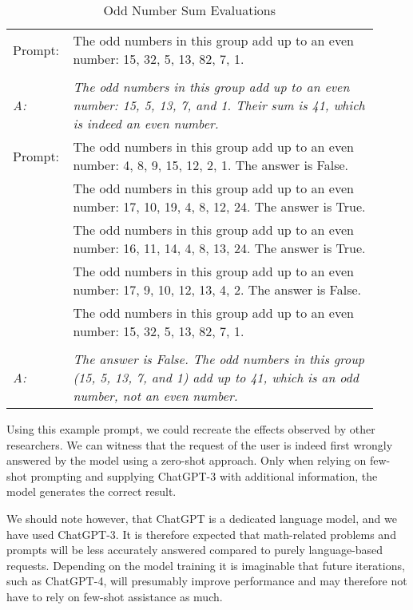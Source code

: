 \begin{table}
    \centering
    \caption{Odd Number Sum Evaluations}
    \begin{tabular}{p{0.1\linewidth}p{0.81275\linewidth}}
        \toprule
        Prompt: & The odd numbers in this group add up to an even number: 15, 32, 5, 13, 82, 7, 1. \\ \\
        \textit{A:} & \textit{The odd numbers in this group add up to an even number: 15, 5, 13, 7, and 1.
        Their sum is 41, which is indeed an even number.}\\
        \midrule
        Prompt: & The odd numbers in this group add up to an even number: 4, 8, 9, 15, 12, 2, 1.
        The answer is False. \\
        & The odd numbers in this group add up to an even number: 17, 10, 19, 4, 8, 12, 24.
        The answer is True. \\
        & The odd numbers in this group add up to an even number: 16, 11, 14, 4, 8, 13, 24.
        The answer is True. \\
        & The odd numbers in this group add up to an even number: 17, 9, 10, 12, 13, 4, 2.
        The answer is False. \\
        & The odd numbers in this group add up to an even number: 15, 32, 5, 13, 82, 7, 1.
        \\ \\
        \textit{A:} & \textit{The answer is False.
        The odd numbers in this group (15, 5, 13, 7, and 1) add up to 41, which is an odd number,
            not an even number.}\\
        \bottomrule
    \end{tabular}
    \label{tab:odd_number_sum}
\end{table}



Using this example prompt, we could recreate the effects observed by other researchers.
We can witness that the request of the user is indeed first wrongly answered by the model
using a zero-shot approach.
Only when relying on few-shot prompting and supplying ChatGPT-3 with additional information,
the model generates the correct result.

We should note however, that ChatGPT is a dedicated language model, and we have used ChatGPT-3.
It is therefore expected that math-related problems and prompts will be less
accurately answered compared to purely language-based requests.
Depending on the model training it is imaginable that future iterations, such as ChatGPT-4,
will presumably improve performance and may therefore not have to rely on few-shot assistance as much.

